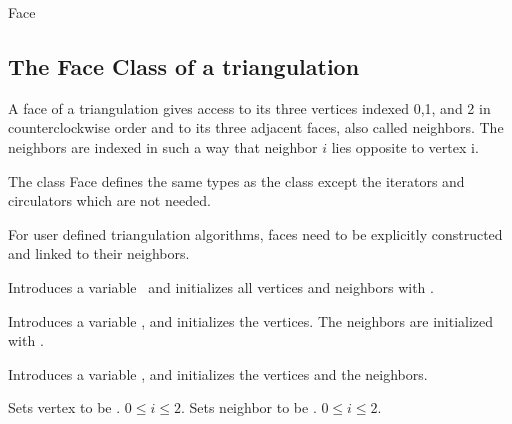 \begin{ccClass} {Face}
\subsection{The Face  Class of a triangulation}
\label{I1_Sect_Triangulation_Face}
\def\ccTagRmEigenClassName{\ccFalse}

\ccDefinition
A face of a triangulation gives access to its three
vertices indexed 0,1, and 2 in counterclockwise order
and to its three adjacent faces, also called neighbors.
The neighbors are indexed in such a way that neighbor $i$ lies
opposite to vertex i. 


\ccTypes
The class  {Face} defines the same types 
as the class  except the iterators and circulators
which are not needed.


\begin{ccAdvanced}

For user defined triangulation algorithms, faces need to
be explicitly constructed and linked to their neighbors.

{Introduces a variable \ccVar\ and initializes all vertices and neighbors 
 with .}

{Introduces a variable \ccVar, and initializes the vertices. The 
neighbors are initialized with .}

{Introduces a variable \ccVar, and initializes the vertices and the neighbors.}





{Sets vertex  to be .
\ccPrecond $0\leq i \leq 2$.
}
\ccGlue
{}
{Sets neighbor  to be .
\ccPrecond $0\leq i \leq 2$.
}
\ccGlue
{}
\ccGlue
{}
\ccGlue
{}
\ccGlue
{}
\end{ccAdvanced} 



\end{ccClass}
